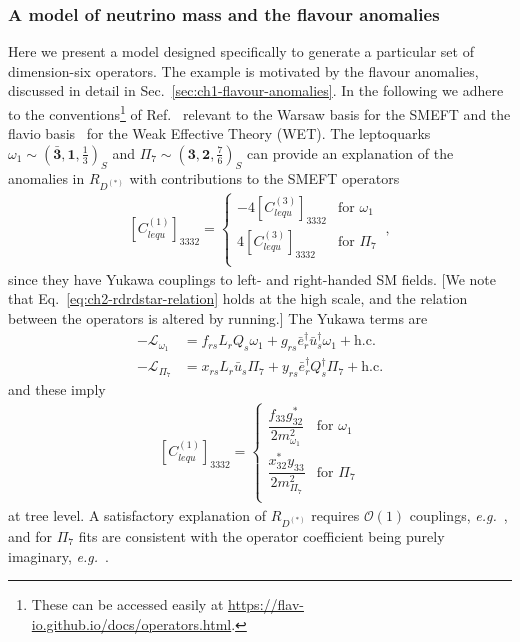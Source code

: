 \subsubsection{A model of neutrino mass and the flavour anomalies}
\label{sec:ch2-anomalies-mv}

Here we present a model designed specifically to generate a particular set of
dimension-six operators. The example is motivated by the flavour anomalies,
discussed in detail in Sec.~\ref{sec:ch1-flavour-anomalies}. In the following we
adhere to the conventions\footnote{These can be accessed easily at
  \url{https://flav-io.github.io/docs/operators.html}.} of
Ref.~\cite{Aebischer:2017ugx} relevant to the Warsaw basis for the SMEFT and the
\textsf{flavio} basis~\cite{Straub:2018kue} for the Weak Effective Theory (WET).
The leptoquarks
$\omega_{1} \sim (\mathbf{\bar{3}}, \mathbf{1}, \tfrac{1}{3})_{S}$ and
$\Pi_{7} \sim (\mathbf{3}, \mathbf{2}, \tfrac{7}{6})_{S}$ can provide an
explanation of the anomalies in $R_{D^{(*)}}$ with contributions to the SMEFT
operators
\begin{align}
  \label{eq:ch2-rdrdstar-relation}
  [C_{lequ}^{(1)}]_{3332} = \begin{cases}
    - 4 [C_{lequ}^{(3)}]_{3332} &\text{for } \omega_{1} \\
    4 [C_{lequ}^{(3)}]_{3332}  &\text{for } \Pi_{7} \\
  \end{cases} \ ,
\end{align}
since they have Yukawa couplings to left- and right-handed SM fields. [We note
that Eq.~\eqref{eq:ch2-rdrdstar-relation} holds at the high scale, and the relation
between the operators is altered by running.] The Yukawa terms are
\begin{align}
  - \mathcal{L}_{\omega_{1}} &= f_{rs} L_{r} Q_{s} \omega_{1} + g_{rs} \bar{e}^{\dagger}_{r} \bar{u}^{\dagger}_{s} \omega_{1} + \text{h.c.} \label{eq:ch2-omega1-coup} \\
  - \mathcal{L}_{\Pi_{7}} &= x_{rs} L_{r} \bar{u}_{s} \Pi_{7} + y_{rs} \bar{e}^{\dagger}_{r} Q^{\dagger}_{s} \Pi_{7} + \text{h.c.} \label{eq:ch2-pi7-coup}
\end{align}
and these imply
\begin{align}
  \label{eq:ch2-omega1-pi7-clequ}
  [C_{lequ}^{(1)}]_{3332} = \begin{cases}
    \dfrac{f_{33} g_{32}^{*}}{2 m_{\omega_{1}}^{2}} &\text{for } \omega_{1} \\
    \dfrac{x_{32}^{*}y_{33}}{2 m_{\Pi_{7}}^{2}} &\text{for } \Pi_{7} \\
  \end{cases}
\end{align}
at tree level. A satisfactory explanation of $R_{D^{(*)}}$ requires
$\mathcal{O}(1)$ couplings, \textit{e.g.}~\cite{Cai:2017wry, Popov:2019tyc}, and
for $\Pi_{7}$ fits are consistent with the operator coefficient being purely
imaginary, \textit{e.g.}~\cite{Angelescu:2018tyl}.

